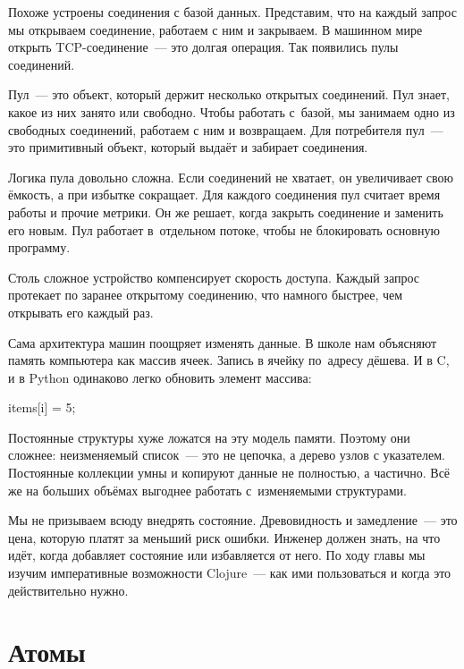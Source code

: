 Похоже устроены соединения с базой данных. Представим, что на каждый запрос мы
открываем соединение, работаем с ним и закрываем. В машинном мире открыть
TCP-соединение~--- это долгая операция. Так появились пулы соединений.


Пул~--- это объект, который держит несколько открытых соединений. Пул знает, какое
из них занято или свободно. Чтобы работать с~базой, мы занимаем одно из
свободных соединений, работаем с ним и возвращаем. Для потребителя пул~--- это
примитивный объект, который выдаёт и забирает соединения.

Логика пула довольно сложна. Если соединений не хватает, он увеличивает свою
ёмкость, а при избытке сокращает. Для каждого соединения пул считает время
работы и прочие метрики. Он же решает, когда закрыть соединение и заменить его
новым. Пул работает в~отдельном потоке, чтобы не блокировать основную программу.

Столь сложное устройство компенсирует скорость доступа. Каждый запрос протекает
по заранее открытому соединению, что намного быстрее, чем открывать его каждый
раз.

Сама архитектура машин поощряет изменять данные. В школе нам объясняют память
компьютера как массив ячеек. Запись в ячейку по~адресу дёшева. И в C\Plus\Plus,
и в Python одинаково легко обновить элемент массива:

\begin{english}
  \begin{python}
items[i] = 5;
  \end{python}
\end{english}

Постоянные структуры хуже ложатся на эту модель памяти. Поэтому они сложнее:
неизменяемый список~--- это не цепочка, а дерево узлов с указателем. Постоянные
коллекции умны и копируют данные не полностью, а частично. Всё же на больших
объёмах выгоднее работать с~изменяемыми структурами.

Мы не призываем всюду внедрять состояние. Древовидность и замедление~--- это цена,
которую платят за меньший риск ошибки. Инженер должен знать, на что идёт,
когда добавляет состояние или избавляется от него. По ходу главы мы изучим
императивные возможности Clojure~--- как ими пользоваться и когда это
действительно нужно.

\section{Атомы}

